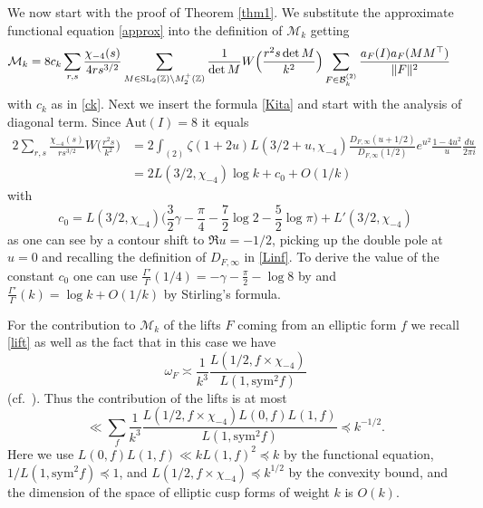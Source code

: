 \documentclass[11pt]{amsart}
\numberwithin{equation}{section}
\theoremstyle{plain}
\theoremstyle{definition}
\numberwithin{equation}{section}
\begin{document}

We now start with the proof of Theorem \ref{thm1}. We substitute the approximate functional equation \eqref{approx} into the definition of $\mathcal{M}_k$ getting
\begin{align}
\mathcal{M}_k 
&= 8c_k\sum_{r, s} \frac{\chi_{-4}(s)}{4rs^{3/2}} \sum_{M \in {\rm SL}_2(\mathbb{Z}) \backslash M_2^+(\mathbb{Z})} \frac{1}{\det M} W\Big( \frac{r^2 s \det M}{k^2}\Big)  \sum_{F \in \mathcal{B}_k^{(2)}} \frac{a_F(I)a_F(MM^{\top})}{\| F \|^2}
\end{align}
with $c_k$ as in \eqref{ck}. Next we insert the formula \eqref{Kita} and start with the analysis of diagonal term. Since $\text{Aut}(I) = 8$ it equals
\begin{align}
2 \sum_{r, s} \frac{\chi_{-4}(s)}{rs^{3/2}}   W\Big( \frac{r^2 s }{k^2}\Big)& =2\int_{(2)} \zeta(1 + 2u)L(3/2 + u, \chi_{-4}) \frac{D_{F,\infty}(u+1/2)}{D_{F,\infty}(1/2)}e^{u^2} \frac{1-4u^2}{u} \frac{du}{2\pi i}\\
& = 2 L(3/2, \chi_{-4}) \log k  + c_0 + O(1/k)
\end{align}
with
\[c_0 = L(3/2, \chi_{-4}) \Big(\frac{3}{2} \gamma - \frac{\pi}{4} -\frac{7}{2} \log 2 - \frac{5}{2} \log \pi\Big) + L'(3/2, \chi_{-4}) \]
as one can see by a contour shift to $\Re u = -1/2$, picking up the double pole at $u = 0$ and recalling the definition of $D_{F,\infty}$ in \eqref{Linf}. To derive the value of the  constant $c_0$ one can use $\frac{\Gamma'}{\Gamma}(1/4) = -\gamma - \frac{\pi}{2} - \log 8$ by \cite[8.364.6]{GR} and $\frac{\Gamma'}{\Gamma}(k) = \log k + O(1/k)$ by Stirling's formula. 


For the contribution to $\mathcal{M}_k$ of the lifts $F$ coming from an elliptic form $f$  we recall \eqref{lift} as well as the fact that in this case we have $$\omega_F \asymp \frac{1}{k^3} \frac{L(1/2, f \times \chi_{-4})}{L(1,\text{sym}^2 f)}$$
(cf.\ \cite[Theorem 3.11]{DPSS}). Thus the contribution of the lifts is at most
$$\ll \sum_f  \frac{1}{k^3}  \frac{L(1/2, f \times \chi_{-4}) L(0, f) L(1, f)}{L(1, \text{sym}^2 f)}  \preccurlyeq k^{  - 1/2}.$$
Here we use $L(0, f)L(1, f) \ll k L(1, f)^2 \preccurlyeq k $ by the functional equation, $1/L(1, \text{sym}^2 f) \preccurlyeq 1$, and $L(1/2, f \times \chi_{-4}) \preccurlyeq k^{1/2 }$ by the convexity bound, and the dimension of the space of elliptic cusp forms of weight $k$ is $O(k)$. 

\end{document}
